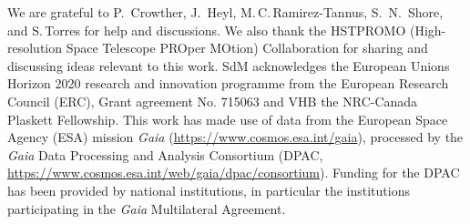 \documentclass[a4paper,fleqn,usenatbib]{mnras}
\begin{document}
{   \small
   We are grateful to P.~Crowther, J.~Heyl, M.\,C.\,Ramirez-Tannus, S.~N.~Shore, and S.\,Torres
   for help and discussions. We also thank the HSTPROMO
(High-resolution Space Telescope PROper MOtion) Collaboration for
sharing and discussing ideas relevant to this work. SdM acknowledges
the European Unions Horizon 2020 research and innovation programme
from the European Research Council (ERC), Grant agreement No. 715063
and VHB the NRC-Canada Plaskett Fellowship. This work has made use of data from the European Space Agency (ESA) mission {\it Gaia} (\url{https://www.cosmos.esa.int/gaia}), processed by the {\it Gaia} Data Processing and Analysis Consortium (DPAC, \url{https://www.cosmos.esa.int/web/gaia/dpac/consortium}). Funding for the DPAC has been provided by national institutions, in particular the institutions
participating in the {\it Gaia} Multilateral Agreement. 
}
\end{document}
